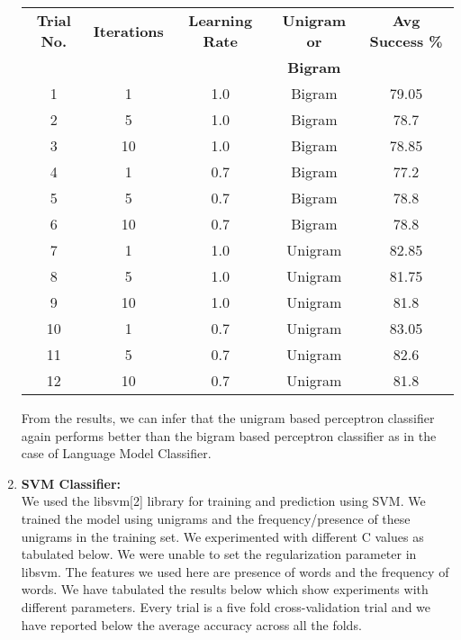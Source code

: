 \documentclass[11pt,a4paper]{article}
\begin{document}
\begin{enumerate}
			
			\begin{center}
				\begin{tabular}{|c|c|c|c|c|}
				\hline
				{\bf Trial No.} & {\bf Iterations} & {\bf Learning Rate } & {\bf Unigram or} &{\bf Avg Success \%} \\
				&&&{\bf Bigram}&\\\hline
				1 &	1&1.0 &Bigram	& 79.05  \\\hline
				2&	5&1.0 &Bigram	& 78.7  \\\hline
				3&	10&1.0 &Bigram	& 78.85 \\\hline
				4 &	1& 0.7 &Bigram	& 77.2  \\\hline
				5&	5& 0.7 &Bigram	& 78.8  \\\hline
				6&	10& 0.7 &Bigram	& 78.8 \\\hline
				7 &	1&1.0 &Unigram	& 82.85 \\\hline
				8&	5&1.0 &Unigram	& 81.75 \\\hline
				9&	10&1.0 &Unigram	& 81.8 \\\hline
				10 &	1& 0.7 &Unigram	& 83.05 \\\hline
				11&	5& 0.7&Unigram	& 82.6 \\\hline
				12&	10& 0.7 &Unigram	&  81.8 \\\hline
				\end{tabular} 
			\end{center}
From the results, we can infer that the unigram based perceptron classifier again performs better than the bigram based perceptron classifier as in the case of Language Model Classifier.				
	
		

		\item
		{\bf SVM Classifier:}\\
		We used the libsvm[2] library for training and prediction using SVM. We trained the model using unigrams and the frequency/presence of these unigrams in the training set. We experimented with different C values as tabulated below. We were unable to set the regularization parameter in libsvm. The features we used here are presence of words and the frequency of words. We have tabulated the results below which show experiments with different parameters. Every trial is a five fold cross-validation trial and we have reported below the average accuracy across all the folds.


\end{enumerate}
\end{document}
